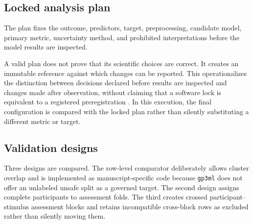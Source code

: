 \subsection{Locked analysis plan}\label{locked-analysis-plan}

The plan fixes the outcome, predictors, target, preprocessing, candidate model, primary metric, uncertainty method, and prohibited interpretations before the model results are inspected.

\begin{table}
\centering
\caption{\label{tab:analysis-plan-code}Locked analysis-plan summary.}
\centering
{}
\end{table}

A valid plan does not prove that its scientific choices are correct. It creates an immutable reference against which changes can be reported. This operationalizes the distinction between decisions declared before results are inspected and changes made after observation, without claiming that a software lock is equivalent to a registered preregistration \citep{Nosek2018}. In this execution, the final configuration is compared with the locked plan rather than silently substituting a different metric or target.

\subsection{Validation designs}\label{validation-designs}

Three designs are compared. The row-level comparator deliberately allows cluster overlap and is implemented as manuscript-specific code because \texttt{gp3ml} does not offer an unlabeled unsafe split as a governed target. The second design assigns complete participants to assessment folds. The third creates crossed participant--stimulus assessment blocks and retains incompatible cross-block rows as excluded rather than silently moving them.


